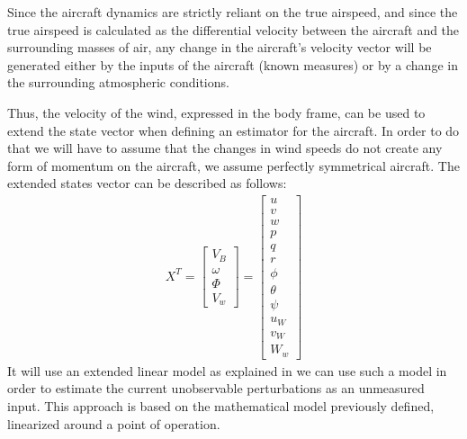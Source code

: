 \documentclass[conference]{IEEEtran}
\begin{document}
\par
Since the aircraft dynamics are strictly reliant on the true airspeed, and
since the true airspeed is calculated as the differential velocity between the
aircraft and the surrounding masses of air, any change in the aircraft's
velocity vector will be generated either by the inputs of the aircraft (known
measures) or by a change in the surrounding atmospheric conditions.
\par
Thus, the velocity of the wind, expressed in the body frame, can be used to
extend the state vector when defining an estimator for the aircraft. In order
to do that we will have to assume that the changes in wind speeds do not create
any form of momentum on the aircraft, we assume perfectly symmetrical aircraft.
The extended states vector can be described as follows:
\begin{align}
    X^T={\begin{bmatrix}
             V_B     \\
             \omega  \\
             \varPhi \\
             V_w
         \end{bmatrix}}
        ={\begin{bmatrix}
                  u      \\
                  v      \\
                  w      \\
                  p      \\
                  q      \\
                  r      \\
                  \phi   \\
                  \theta \\
                  \psi   \\
                  u_W    \\
                  v_W    \\
                  W_w
              \end{bmatrix}}
    \label{ExtendedSystemStates}
\end{align}
It will use an extended linear model as explained in {\cite{state_estimation}} we can use such a model in order to estimate the current unobservable perturbations as an unmeasured input.
This approach is based on the mathematical model previously defined, linearized around a point of operation.

\end{document}
